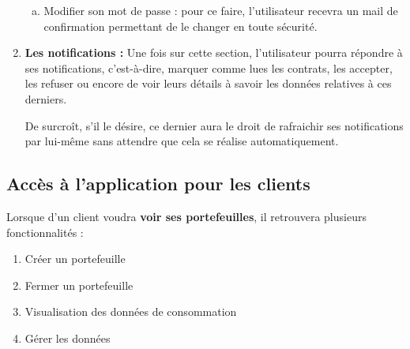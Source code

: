 \begin{enumerate}[1.]
\begin{enumerate}[a)]
\item Modifier son mot de passe : pour ce faire, l’utilisateur recevra un mail de confirmation permettant de le changer en toute sécurité.
\end{enumerate}

\item \textbf{Les notifications :}\newline
Une fois sur cette section, l’utilisateur pourra répondre à ses notifications, c’est-à-dire, marquer comme lues les contrats, les accepter, les refuser ou encore de voir leurs détails à savoir les données relatives à ces derniers. \newline

De surcroît, s’il le désire, ce dernier aura le droit de rafraichir ses notifications par lui-même sans attendre que cela se réalise automatiquement.

\end{enumerate}

\newpage
\subsection{Accès à l'application pour les clients}

Lorsque d’un client voudra \textbf{voir ses portefeuilles}, \newline il retrouvera plusieurs fonctionnalités :

\begin{enumerate}[1.]
\item Créer un portefeuille
\item Fermer un portefeuille
\item Visualisation des données de consommation
\item Gérer les données
\end{enumerate}

